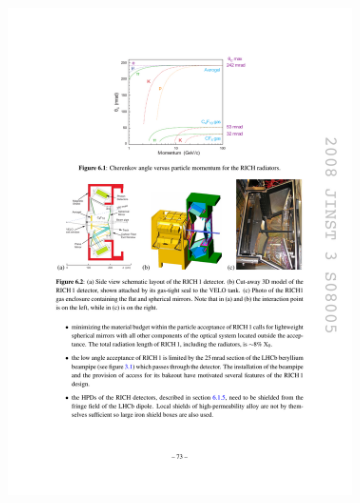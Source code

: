 \begin{figure}[!h]
    \centering
    \begin{subfigure}[t]{0.4\textwidth}
        \centering        
        \includegraphics[width=1.0\textwidth]{figs/Detector/richone_layout.pdf}
        \caption{\richone}
    \end{subfigure}
    \begin{subfigure}[t]{0.4\textwidth}
        \centering

\end{subfigure}
\end{figure}
